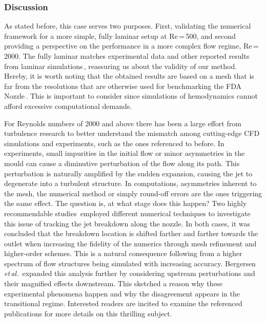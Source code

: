 \subsubsection*{Discussion}
As stated before, this case serves two purposes. First, validating the numerical framework for a more simple, fully laminar setup at Re\,=\,500, and second providing a perspective on the performance in a more complex flow regime, Re\,=\,2000. The fully laminar matches experimental data and other reported results from laminar simulations\,\cite{Stewart2012}, reassuring us about the validity of our method. Hereby, it is worth noting that the obtained results are based on a mesh that is far from the resolutions that are otherwise used for benchmarking the FDA Nozzle\,\cite{Jain2020, Bergersen2019}. This is important to consider since simulations of hemodynamics cannot afford excessive computational demands.

For Reynolds numbers of 2000 and above there has been a large effort from turbulence research to better understand the mismatch among cutting-edge CFD simulations and experiments, such as the ones referenced to before. In experiments, small impurities in the initial flow or minor asymmetries in the mould can cause a diminutive perturbation of the flow along its path. This perturbation is naturally amplified by the sudden expansion, causing the jet to degenerate into a turbulent structure. In computations, asymmetries inherent to the mesh, the numerical method or simply round-off errors are the ones triggering the same effect. The question is, at what stage does this happen? Two highly recommendable studies\,\cite{Jain2020, Bergersen2019} employed different numerical techniques to investigate this issue of tracking the jet breakdown along the nozzle. In both cases, it was concluded that the breakdown location is shifted farther and farther towards the outlet when increasing the fidelity of the numerics through mesh refinement and higher-order schemes. This is a natural consequence following from a higher spectrum of flow structures being simulated with increasing accuracy. Bergersen \textit{et\,al.}\,\cite{Bergersen2019} expanded this analysis further by considering upstream perturbations and their magnified effects downstream. This sketched a reason why these experimental phenomena happen and why the disagreement appears in the transitional regime. Interested readers are incited to examine the referenced publications for more details on this thrilling subject.\\\vspace*{1cm}


